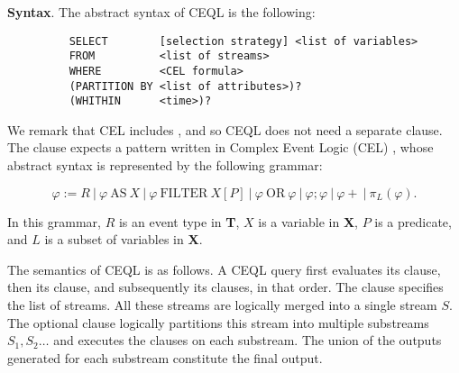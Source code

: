 \textbf{Syntax}. The abstract syntax of CEQL is the following:

\begin{figure}[H]
  \begin{verbatim}
    SELECT        [selection strategy] <list of variables>
    FROM          <list of streams>
    WHERE         <CEL formula>
    (PARTITION BY <list of attributes>)?
    (WHITHIN      <time>)?
  \end{verbatim}
\end{figure}

\vspace{-30pt}
We remark that CEL includes , and so CEQL does not need a separate  clause. The  clause expects a pattern written in Complex Event Logic (CEL) \cite{formal-framework-cer}, whose abstract syntax is represented by the following grammar:

\vspace{-20pt}
\begin{equation*}
  \varphi := R    \ | \ \varphi \ \text{AS} \ X    \ | \    \varphi \ \text{FILTER} \ X[P]  \ | \   \varphi \ \text{OR} \ \varphi   \ | \  \varphi ; \varphi    \ | \  \varphi+ \ | \ \pi_{L}(\varphi).
\end{equation*}

\vspace{-10pt}
In this grammar, $R$ is an event type in \textbf{T}, $X$ is a variable in \textbf{X}, $P$ is a predicate, and $L$ is a subset of variables in \textbf{X}.

The semantics of CEQL is as follows. A CEQL query first evaluates its  clause, then its  clause, and subsequently its  clauses, in that order. The  clause specifies the list of streams. All these streams are logically merged into a single stream $S$. The optional  clause logically partitions this stream into multiple substreams $S_{1}, S_{2}\ldots$ and executes the  clauses on each substream. The union of the outputs generated for each substream constitute the final output.


